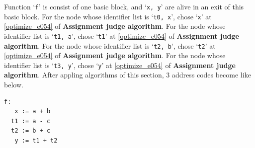 \begin{Example}
\begin{figure}[htbp]
\end{figure}
Function `{\tt{f}}' is consist of one basic block, and 
`{\tt{x, y}}' are alive in an exit of this basic block.
For the node whose identifier list is `{\tt{t0, x}}',
chose `{\tt{x}}' at \ref{optimize_e054} of {\bf Assignment judge algorithm}.
For the node whose identifier list is `{\tt{t1, a}}',
chose `{\tt{t1}}' at \ref{optimize_e054} of {\bf Assignment judge algorithm}.
For the node whose identifier list is `{\tt{t2, b}}',
chose `{\tt{t2}}' at \ref{optimize_e054} of {\bf Assignment judge algorithm}.
For the node whose identifier list is `{\tt{t3, y}}',
chose `{\tt{y}}' at \ref{optimize_e054} of {\bf Assignment judge algorithm}.
After appling algorithms of this section,
3 address codes become like below.
\begin{verbatim}
f:
   x := a + b
  t1 := a - c
  t2 := b + c
   y := t1 + t2
\end{verbatim}
\end{Example}

